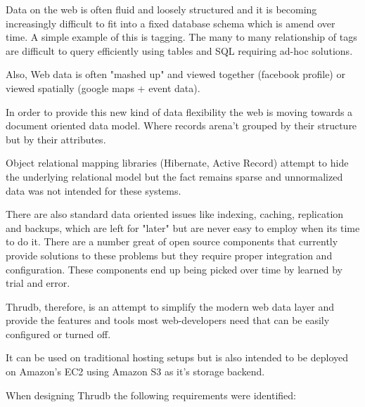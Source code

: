 \documentclass[nocopyrightspace,blockstyle]{sigplanconf}
\begin{document}
Data on the web is often fluid and loosely structured and it is becoming increasingly difficult to fit into a fixed database schema which is amend over time.
A simple example of this is tagging. The many to many relationship of tags are difficult to query efficiently using tables and SQL requiring ad-hoc solutions.

Also, Web data is often "mashed up" and viewed together (facebook profile) or viewed spatially (google maps + event data). 

In order to provide this new kind of data flexibility the web is moving towards a document oriented data model.  Where records arena't grouped by their structure but by their attributes.  

Object relational mapping libraries (Hibernate, Active Record) attempt to hide the underlying relational model but the fact remains sparse and unnormalized data was not intended for these systems. 

There are also standard data oriented issues like indexing, caching, replication and backups, which are left for "later" but are never easy to employ when its time to do it.
There are a number great of open source components that currently provide solutions to these problems but they require proper integration and configuration.  These components end up being picked over time by learned by trial and error.

Thrudb, therefore, is an attempt to simplify the modern web data layer and provide the features and tools most web-developers need that can be easily configured or turned off.

It can be used on traditional hosting setups but is also intended to be deployed on Amazon's EC2 using Amazon S3 as it's storage backend.

When designing Thrudb the following requirements were identified:
\end{document}

